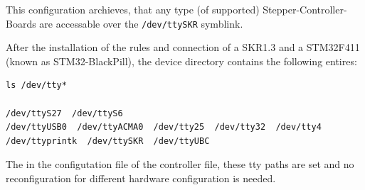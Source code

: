 \documentclass[
  english,
  paper=a4,
  ,captions=tableheading
]{scrartcl}
\newcommand{\passthrough}[1]{#1}
\begin{document}
This configuration archieves, that any type (of supported)
Stepper-Controller-Boards are accessable over the
\passthrough{\lstinline!/dev/ttySKR!} symblink.

After the installation of the rules and connection of a SKR1.3 and a
STM32F411 (known as STM32-BlackPill), the device directory contains the
following entires:

\begin{lstlisting}
ls /dev/tty*

/dev/ttyS27  /dev/ttyS6
/dev/ttyUSB0  /dev/ttyACMA0  /dev/tty25  /dev/tty32  /dev/tty4  /dev/ttyprintk  /dev/ttySKR  /dev/ttyUBC
\end{lstlisting}

The in the configutation file of the controller file, these tty paths
are set and no reconfiguration for different hardware configuration is
needed.
\end{document}
